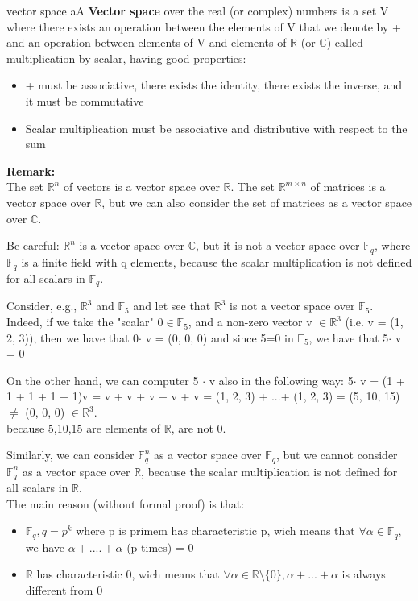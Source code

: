 \begin{defBox}{vector space}
    aA \textbf{Vector space} over the real (or complex) numbers is a set V where there exists an operation between the elements of V that we denote by + and an operation between elements of V and elements of $\mathbb{R}$ (or $\mathbb{C}$) called multiplication by scalar, having good properties:

    \begin{itemize}
        \item + must be associative, there exists the identity, there exists the inverse, and it must be commutative
        \item Scalar multiplication must be associative and distributive with respect to the sum
    \end{itemize}
\end{defBox}
\medskip

\noindent
\textbf{Remark:}\\
The set $\mathbb{R}^n$ of vectors is a vector space over $\mathbb{R}$. The set $\mathbb{R}^{m \times n}$ of matrices is a vector space over $\mathbb{R}$, but we can also consider the set of matrices as a vector space over $\mathbb{C}$.
\bigskip

\noindent
Be careful: $\mathbb{R}^n$ is a vector space over $\mathbb{C}$, but it is not a vector space over $\mathbb{F}_q$, where $\mathbb{F}_q$ is a finite field with q elements, because the scalar multiplication is not defined for all scalars in $\mathbb{F}_q$.\medskip

\noindent
Consider, e.g., $\mathbb{R}^3$ and $\mathbb{F}_5$ and let see that $\mathbb{R}^3$ is not a vector space over $\mathbb{F}_5$.\\
Indeed, if we take the "scalar" 0$ \in \mathbb{F}_5$, and a non-zero vector v $ \in \mathbb{R}^3$ (i.e. v = (1, 2, 3)), then we have that 0$\cdot$ v = (0, 0, 0) and since 5=0 in $\mathbb{F}_5$, we have that 5$\cdot$ v = 0
\smallskip

\noindent
On the other hand, we can computer 5 $\cdot$ v also in the following way: 5$\cdot$ v = (1 + 1 + 1 + 1 + 1)v = v + v + v + v + v = (1, 2, 3) + ...+ (1, 2, 3) = (5, 10, 15) $\neq$ (0, 0, 0) $\in \mathbb{R}^3$.\\
because 5,10,15 are elements of $\mathbb{R}$, are not 0.
\bigskip

\noindent
Similarly, we can consider $\mathbb{F}_q^n$ as a vector space over $\mathbb{F}_q$, but we cannot consider $\mathbb{F}_q^n$ as a vector space over $\mathbb{R}$, because the scalar multiplication is not defined for all scalars in $\mathbb{R}$.\\
The main reason (without formal proof) is that:
\begin{itemize}
    \item $\mathbb{F}_q, q = p^k$ where p is primem has characteristic p, wich means that $\forall \alpha \in \mathbb{F}_q$, we have $\alpha + ....+ \alpha$ (p times) = 0
    \item $\mathbb{R}$ has characteristic 0, wich means that $\forall \alpha \in \mathbb{R} \setminus \{0\}, \alpha+...+ \alpha$ is always different from 0
\end{itemize}

